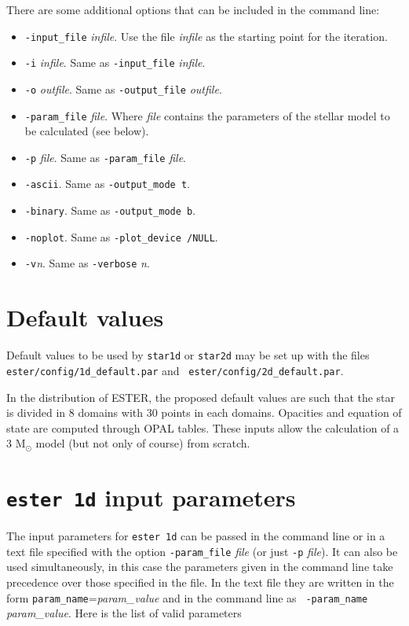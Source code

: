 There are some additional options that can be included in the command line:
\begin{itemize}
\item[] {\tt -input\_file} {\it infile}. Use the file {\it infile} as the starting point
for the iteration.
\item[] {\tt -i} {\it infile}. Same as {\tt -input\_file} {\it infile}.
\item[] {\tt -o} {\it outfile}. Same as {\tt -output\_file} {\it outfile}.
\item[] {\tt -param\_file} {\it file}. Where {\it file} contains the parameters of the 
stellar model to be calculated (see below).
\item[] {\tt -p} {\it file}. Same as {\tt -param\_file} {\it file}.
\item[] {\tt -ascii}. Same as {\tt -output\_mode t}.
\item[] {\tt -binary}. Same as {\tt -output\_mode b}.
\item[] {\tt -noplot}. Same as {\tt -plot\_device /NULL}.
\item[] {\tt -v}{\it n}. Same as {\tt -verbose} {\it n}.
\end{itemize}

\section{Default values}

Default values to be used by {\tt star1d} or {\tt star2d} may be set up
with the files {\tt ester/config/1d\_default.par} and {\tt
ester/config/2d\_default.par}.

In the distribution of ESTER, the proposed default values are such that
the star is divided in 8 domains with 30 points in
each domains. Opacities and equation of state
are computed through OPAL tables. These inputs allow the calculation of
a 3 M$_\odot$ model (but not only of course) from scratch.

\section{{\tt ester 1d} input parameters}

The input parameters for {\tt ester 1d} can be passed in the command line
or in a text file specified with the option {\tt -param\_file} {\it file}
(or just {\tt -p} {\it file}). It can also be used simultaneously, in
this case the parameters given in the command line take precedence over
those specified in the file. In the text file they are written in the
form {\tt param\_name}={\it param\_value} and in the command line as {\tt
-param\_name} {\it param\_value}.  Here is the list of valid parameters

